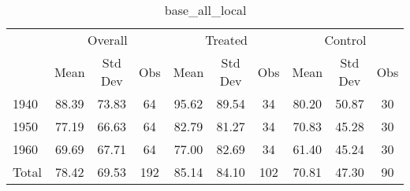 \begin{table}[htbp]\centering
\def\sym#1{\ifmmode^{#1}\else\(^{#1}\)\fi}
\caption{base\_all\_local \label{tab1}}
\begin{tabular}{l*{3}{ccc}}
\toprule
                    &\multicolumn{3}{c}{Overall}           &\multicolumn{3}{c}{Treated}           &\multicolumn{3}{c}{Control}           \\
                    &        Mean&     Std Dev&         Obs&        Mean&     Std Dev&         Obs&        Mean&     Std Dev&         Obs\\
\midrule
1940                &       88.39&       73.83&          64&       95.62&       89.54&          34&       80.20&       50.87&          30\\
1950                &       77.19&       66.63&          64&       82.79&       81.27&          34&       70.83&       45.28&          30\\
1960                &       69.69&       67.71&          64&       77.00&       82.69&          34&       61.40&       45.24&          30\\
Total               &       78.42&       69.53&         192&       85.14&       84.10&         102&       70.81&       47.30&          90\\
\bottomrule
\end{tabular}
\end{table}
